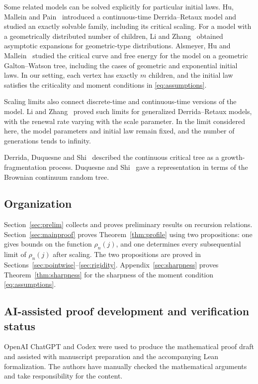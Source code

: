 \documentclass[11pt,letterpaper,reqno]{amsart}
\numberwithin{equation}{section}
\theoremstyle{plain}
\theoremstyle{remark}
\begin{document}
Some related models can be solved explicitly for particular initial laws. Hu, Mallein and Pain~\cite{HMP} introduced a continuous-time Derrida--Retaux model and studied an exactly solvable family, including its critical scaling. For a model with a geometrically distributed number of children, Li and Zhang~\cite{LZ} obtained asymptotic expansions for geometric-type distributions. Alsmeyer, Hu and Mallein~\cite{AHM} studied the critical curve and free energy for the model on a geometric Galton--Watson tree, including the cases of geometric and exponential initial laws. In our setting, each vertex has exactly $m$ children, and the initial law satisfies the criticality and moment conditions in \eqref{eq:assumptions}.

Scaling limits also connect discrete-time and continuous-time versions of the model. Li and Zhang~\cite{LZscale} proved such limits for generalized Derrida--Retaux models, with the renewal rate varying with the scale parameter. In the limit considered here, the model parameters and initial law remain fixed, and the number of generations tends to infinity.

Derrida, Duquesne and Shi~\cite{DDS} described the continuous critical tree as a growth-fragmentation process. Duquesne and Shi~\cite{DuS} gave a representation in terms of the Brownian continuum random tree.

\subsection{Organization}
Section~\ref{sec:prelim} collects and proves preliminary results on recursion relations. Section~\ref{sec:mainproof} proves Theorem~\ref{thm:profile} using two propositions: one gives bounds on the function $\rho_n(j)$, and one determines every subsequential limit of $\rho_{n}(j)$ after scaling. The two propositions are proved in Sections~\ref{sec:pointwise}--\ref{sec:rigidity}. Appendix~\ref{sec:sharpness} proves Theorem~\ref{thm:sharpness} for the sharpness of the moment condition \eqref{eq:assumptions}.

\subsection{AI-assisted proof development and verification status}
\label{subsec:ai-declaration}

OpenAI ChatGPT and Codex were used to produce the mathematical proof draft
and assisted with manuscript preparation and the accompanying Lean
formalization. The authors have manually checked the mathematical arguments
and take responsibility for the content.
\end{document}
